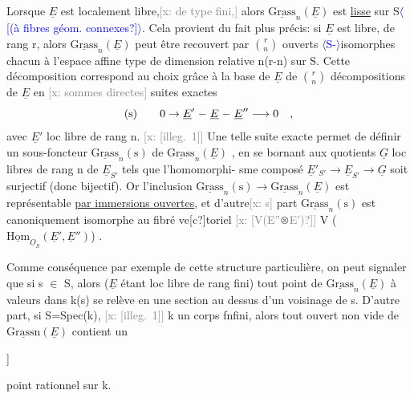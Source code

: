 \documentclass[11pt]{article}
\newcommand{\scanpage}[1]{\par\bigskip\noindent{\small\sffamily[scan #1]}\par}
\newcommand{\mspage}[1]{{\small\sffamily[p.\,#1]}}
\newcommand{\inserted}[2][]{\textcolor{blue}{$\langle$#2$\rangle$}}
\newcommand{\xout}[1]{\textcolor{gray}{[\textsf{x:} #1]}}
\newcommand{\uline}[1]{\underline{#1}}
\newcommand{\unsure}[1]{[#1?]}
\newcommand{\illegible}[1]{[\textsf{illeg.\ #1}]}
\begin{document}
Lorsque $\underline{E}$  est localement libre,\xout{de type fini,} alors  $\underline{\text{Grass}}_n(\underline{E})$
est \uline{lisse} sur S\inserted{\unsure{(à fibres géom. connexes}}. Cela provient du fait plus précis: si $\underline{E}$ est libre,
de rang r, alors  $\underline{\text{Grass}}_n(\underline{E})$  peut être recouvert par  $\binom{r}{n}$  ouverts
\inserted{S-}isomorphes chacun  à  l'espace affine type de dimension relative
n(r-n)  sur S.  Cette décomposition correspond au choix grâce à la base
de $\underline{E}$  de  $\binom{r}{n}$  décompositions de $\underline{E}$  en \xout{sommes directes} suites
exactes
\[
\text{(s)} \qquad 0 \rightarrow \underline{E}' \relbar \underline{E} \relbar \underline{E}'' \longrightarrow 0 \quad ,
\]
avec $\underline{E}'$  loc libre de rang n. \xout{\illegible{1}} Une telle suite exacte permet
de définir un sous-foncteur  $\underline{\text{Grass}}_n(\text{s})$  de  $\underline{\text{Grass}}_n(\underline{E})$ , en se bornant
aux  quotients  $\underline{G}$  loc libres de rang  n de  $\underline{E}_{S'}$  tels que l'homomorphi-%
sme composé  $\underline{E}'_{S'} \longrightarrow \underline{E}_{S'} \longrightarrow \underline{G}$  soit surjectif (donc bijectif). Or
l'inclusion  $\underline{\text{Grass}}_n(\text{s}) \rightarrow \underline{\text{Grass}}_n(\underline{E})$  est représentable \uline{par immersions
ouvertes}, et d'autre\xout{s} part  $\underline{\text{Grass}}_n(\text{s})$  est canoniquement isomorphe
au fibré ve\unsure{c}toriel  \xout{\unsure{V(E''⊗E')}}  V ( $\underline{\text{Hom}}_{\underline{O}_S}(\underline{E}',\underline{E}'')$) .

Comme conséquence par exemple de cette structure particulière,
on peut signaler que si s $\in$ S, alors ($\underline{E}$ étant loc libre de rang fini)
tout point de $\underline{\text{Grass}}_n(\underline{E})$  à valeurs dans k(s)  se relève en une section
au dessus d'un voisinage de s.  D'autre part, si S=Spec(k), \xout{\illegible{1}} k
un corps fnfini, alors tout ouvert non vide de $\underline{\text{Grassn}}(\underline{E})$  contient un

\mspage{63}

\clearpage
\scanpage{25/64}
\mspage{\unsure{57}}

point rationnel sur k.
\end{document}
